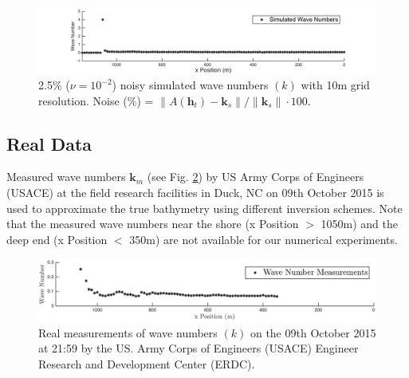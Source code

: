 \begin{figure}[H]
\center
\includegraphics[scale=0.6]{img/simulated_data_k10m.png} 
\caption{2.5\% ($\nu = 10^{-2}$) noisy simulated wave numbers $(k)$ with 10m grid resolution. Noise (\%) = $\|A(\mathbf{h}_t) -  \mathbf{k}_s\| / \|  \mathbf{k}_s \| \cdot 100$. }
\label{Simulated10m}
\end{figure}


\subsection{Real Data}\label{realData}


Measured wave numbers $\mathbf{k}_m$ (see Fig. \ref{RealData_oct09}) by US Army Corps of Engineers (USACE) at the field research facilities in Duck, NC on 09th October 2015  is used to approximate the true bathymetry using different inversion schemes. Note that the measured wave numbers near the shore (x Position $>$ 1050m) and the deep end (x Position $<$ 350m) are not available for our numerical experiments. 

\begin{figure}[H]
\center
\includegraphics[scale=0.5]{img/real_data_k_Oct09.png} 
\caption{Real measurements of wave numbers $(k)$ on the 09th October 2015 at 21:59 by the US. Army Corps of Engineers (USACE) Engineer Research and Development Center (ERDC).}
\label{RealData_oct09}
\end{figure}




